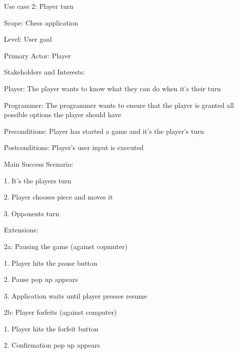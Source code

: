 \documentclass[letterpaper,11pt]{article}
\begin{document}
\begin{list}{}{}
	\item Use case 2: Player turn
	\item Scope: Chess application
	\item Level: User goal
	\item Primary Actor: Player
	\item Stakeholders and Interests:
	\item \begin{list}{}{}
			\item Player: The player wants to know what they can do when it's their turn
			\item Programmer: The programmer wants to ensure that the player is granted all possible options the player should have
		\end{list}
	\item Preconditions: Player has started a game and it's the player's turn
	\item Postconditions: Player's user input is executed
	\item Main Success Scenario:
	\item \begin{list}{}{}
			\item 1. It's the players turn
			\item 2. Player chooses piece and moves it
			\item 3. Opponents turn
		\end{list}
	\item Extensions:
	\item \begin{list}{}{}
			\item 2a: Pausing the game (against copmuter)
			\item \begin{list}{}{}
					\item 1. Player hits the pause button
					\item 2. Pause pop up appears
					\item 3. Application waits until player presses resume
				\end{list}
			\item 2b: Player forfeits (against computer)
			\item \begin{list}{}{}
					\item 1. Player hits the forfeit button
					\item 2. Confirmation pop up appears
					\item \begin{list}{}{}

\end{list}
\end{list}
\end{list}
\end{list}
\end{document}
